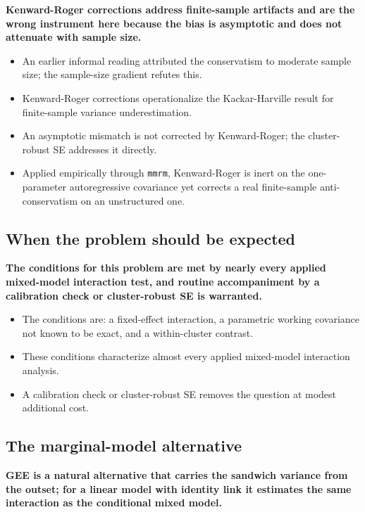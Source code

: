 \documentclass[
  11pt,
]{article}
\begin{document}
\textbf{Kenward-Roger corrections address finite-sample artifacts and are the wrong instrument here because the bias is asymptotic and does not attenuate with sample size.}

\begin{itemize}\setlength{\itemsep}{2pt}\setlength{\parskip}{0pt}
\item An earlier informal reading attributed the conservatism to moderate sample size; the sample-size gradient refutes this.
\item Kenward-Roger corrections operationalize the Kackar-Harville result for finite-sample variance underestimation.
\item An asymptotic mismatch is not corrected by Kenward-Roger; the cluster-robust SE addresses it directly.
\item Applied empirically through \texttt{mmrm}, Kenward-Roger is inert on the one-parameter autoregressive covariance yet corrects a real finite-sample anti-conservatism on an unstructured one.
\end{itemize}

\subsection{When the problem should be expected}\label{when-the-problem-should-be-expected}

\textbf{The conditions for this problem are met by nearly every applied mixed-model interaction test, and routine accompaniment by a calibration check or cluster-robust SE is warranted.}

\begin{itemize}\setlength{\itemsep}{2pt}\setlength{\parskip}{0pt}
\item The conditions are: a fixed-effect interaction, a parametric working covariance not known to be exact, and a within-cluster contrast.
\item These conditions characterize almost every applied mixed-model interaction analysis.
\item A calibration check or cluster-robust SE removes the question at modest additional cost.
\end{itemize}

\subsection{The marginal-model alternative}\label{the-marginal-model-alternative}

\textbf{GEE is a natural alternative that carries the sandwich variance from the outset; for a linear model with identity link it estimates the same interaction as the conditional mixed model.}
\end{document}
